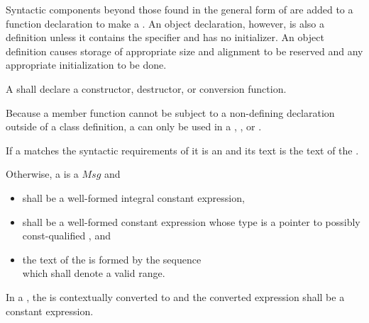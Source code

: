 \documentclass{wg21}
\begin{document}
\pnum
{}%
Syntactic components beyond those found in the general form of
 are added to a function declaration to make a
. An object declaration, however, is also
a definition unless it contains the  specifier and has no
initializer.
%
An object definition causes storage of appropriate size and alignment to be reserved and
any appropriate initialization to be done.

\pnum
A  shall declare a
constructor, destructor, or conversion function.
\begin{note}
 Because a member function cannot be subject to a non-defining declaration
 outside of a class definition, a 
 can only be used in a ,
 , or
 .
\end{note}


\begin{addedblock}
\pnum

If a  matches the syntactic requirements of 
it is an  and its text is the text of the .

Otherwise, a  is a  $Msg$ and
\begin{itemize}
    \item {} shall be a well-formed integral constant expression,
    \item {} shall be a well-formed constant expression whose type is a pointer to possibly const-qualified , and
    \item the text of the  is formed by the sequence\\ \tcode{[$Msg$.data(), $Msg$.data() + $Msg$.size())} which shall denote a valid range.
\end{itemize}
\end{addedblock}

In a ,
the 
is contextually converted to  and
the converted expression shall be a constant expression.
\end{document}
